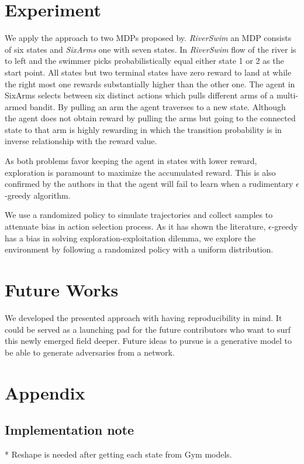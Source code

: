 \documentclass{article}
\begin{document}
    \section{Experiment}
    We apply the approach to two MDPs proposed by\cite{Strehl2004}.
    \textit{RiverSwim} an MDP consists of six states and \textit{SixArms} one with seven states.
    In \textit{RiverSwim} flow of the river is to left and the swimmer picks probabilistically equal either state 1
    or 2 as the start point.
    All states but two terminal states have zero reward to land at while the right most one rewards substantially
    higher than the other one.
    The agent in SixArms selects between six distinct actions which pulls different arms of a multi-armed bandit.
    By pulling an arm the agent traverses to a new state.
    Although the agent does not obtain reward by pulling the arms but going to the connected state to that arm is
    highly rewarding in which the transition probability is in inverse relationship with the reward value.

    As both problems favor keeping the agent in states with lower reward, exploration is paramount to maximize the
    accumulated reward.
    This is also confirmed by the authors in \cite{Strehl2004} that the agent will fail to learn when a rudimentary
    $\epsilon$-greedy algorithm.

    We use a randomized policy to simulate trajectories and collect samples to attenuate bias in action selection
    process.
    As it has shown the literature, $\epsilon$-greedy has a bias in solving exploration-exploitation dilemma, we
    explore the environment by following a randomized policy with a uniform distribution.

    \section{Future Works}
    We developed the presented approach with having reproducibility in mind.
    It could be served as a launching pad for the future contributors who want to surf this newly emerged field deeper.
    Future ideas to pursue is a generative model to be able to generate adversaries from a network.

    \section*{Appendix}

    \subsection{Implementation note}
    * Reshape is needed after getting each state from Gym models.
\end{document}
